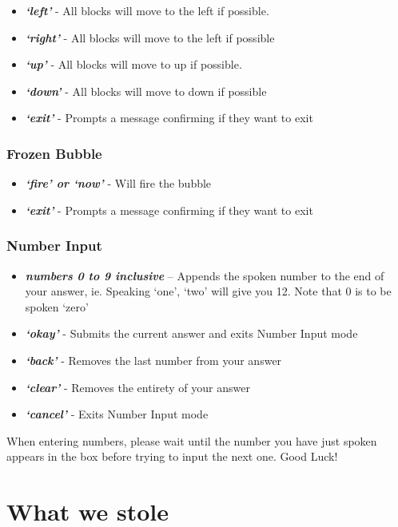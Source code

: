 \documentclass[11pt, oneside]{article}
\begin{document}
\begin{itemize}
	\item {\em\bf`left'} - All blocks will move to the left if possible. 
	\item {\em\bf`right'} - All blocks will move to the left if possible
	\item {\em\bf`up'} - All blocks will move to up if possible. 
	\item {\em\bf`down'} - All blocks will move to down if possible
	\item {\em\bf`exit'} - Prompts a message confirming if they want to exit
	
\end{itemize}

\subsubsection*{Frozen Bubble}

\begin{itemize}
	\item {\em\bf`fire' or `now'} - Will fire the bubble
	\item {\em\bf`exit'} - Prompts a message confirming if they want to exit
	
\end{itemize}

\pagebreak

\subsubsection*{Number Input}
\begin{itemize}
  \item {\em\bf numbers 0 to 9 inclusive} – Appends the spoken number
    to the end of your answer, ie. Speaking `one', `two' will give you
    12. Note that 0 is to be spoken `zero'
  \item {\em\bf `okay'} - Submits the current answer and exits Number
    Input mode
  \item {\em\bf `back'} - Removes the last number from your answer
  \item {\em\bf `clear'} - Removes the entirety of your answer
  \item {\em\bf `cancel'} - Exits Number Input mode
\end{itemize}

When entering numbers, please wait until the number you have just spoken appears
in the box before trying to input the next one.
Good Luck!

\section*{What we stole}
\end{document}
